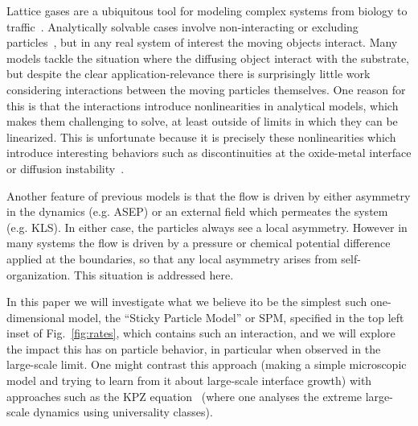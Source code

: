 \documentclass[
reprint, amsmath,amssymb,
]{revtex4-1}
\begin{document}
Lattice gases are a ubiquitous tool for modeling complex systems from
biology to traffic~\cite{1742-5468-2011-07-P07007, Mobilia2007,
  tegner2015high, zhu2012atomic, DealGrove1965, MottCabrera1949,
  Buzzaccaro2007}.  Analytically solvable cases involve
non-interacting or excluding particles~\cite{ladd1988application,
  liggett1985interacting, BenNaim1999, Shandarin1989, Frachebourg1999,
  Frachebourg2000}, but in any real system of interest the moving
objects interact. Many models tackle the situation where the diffusing
object interact with the substrate, but despite the clear
application-relevance there is surprisingly little work considering
interactions between the moving particles themselves.  One reason for
this is that the interactions introduce nonlinearities in analytical
models, which makes them challenging to solve, at least outside of
limits in which they can be linearized. This is unfortunate because it
is precisely these nonlinearities which introduce interesting
behaviors such as discontinuities at the oxide-metal interface or
diffusion instability~\cite{Obukhovsky2017, Gorokhova2010}.

Another feature of previous models is that the flow is driven by
either asymmetry in the dynamics (e.g. ASEP) or an external field
which permeates the system (e.g. KLS).  In either case, the particles
always see a local asymmetry.  However in many systems the flow is
driven by a pressure or chemical potential difference applied at the
boundaries, so that any local asymmetry arises from self-organization.
This situation is addressed here.

In this paper we will investigate what we believe ito be the simplest such one-dimensional model, the
``Sticky Particle Model'' or SPM, specified in the top left inset of
Fig.~\ref{fig:rates}, which contains such an interaction, and we
will explore the impact this has on particle behavior, in particular
when observed in the large-scale limit.  One might contrast this
approach (making a simple microscopic model and trying to learn from
it about large-scale interface growth) with approaches such as the KPZ
equation~\cite{PhysRevLett.56.889, PhysRevA.38.4271, Sasamoto2010}
(where one analyses the extreme large-scale dynamics using
universality classes).
\end{document}
